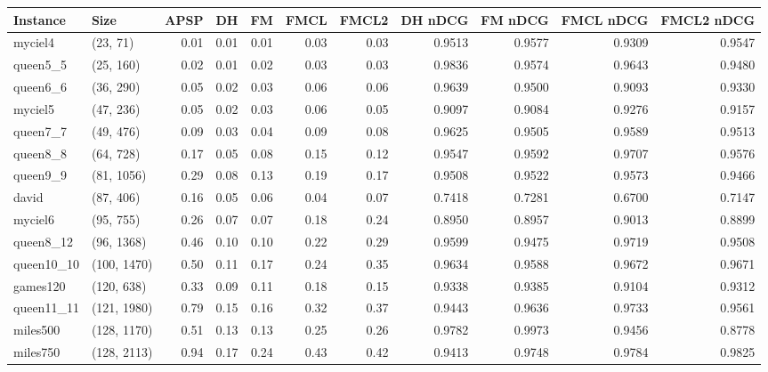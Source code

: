 \begin{tabular}{llrrrrrrrrr}
\toprule
  Instance &         Size &  APSP &   DH &   FM &  FMCL &  FMCL2 &  DH nDCG &  FM nDCG &  FMCL nDCG &  FMCL2 nDCG \\
\midrule
   myciel4 &     (23, 71) &  0.01 & 0.01 & 0.01 &  0.03 &   0.03 &   0.9513 &   0.9577 &     0.9309 &      0.9547 \\
  queen5\_5 &    (25, 160) &  0.02 & 0.01 & 0.02 &  0.03 &   0.03 &   0.9836 &   0.9574 &     0.9643 &      0.9480 \\
  queen6\_6 &    (36, 290) &  0.05 & 0.02 & 0.03 &  0.06 &   0.06 &   0.9639 &   0.9500 &     0.9093 &      0.9330 \\
   myciel5 &    (47, 236) &  0.05 & 0.02 & 0.03 &  0.06 &   0.05 &   0.9097 &   0.9084 &     0.9276 &      0.9157 \\
  queen7\_7 &    (49, 476) &  0.09 & 0.03 & 0.04 &  0.09 &   0.08 &   0.9625 &   0.9505 &     0.9589 &      0.9513 \\
  queen8\_8 &    (64, 728) &  0.17 & 0.05 & 0.08 &  0.15 &   0.12 &   0.9547 &   0.9592 &     0.9707 &      0.9576 \\
  queen9\_9 &   (81, 1056) &  0.29 & 0.08 & 0.13 &  0.19 &   0.17 &   0.9508 &   0.9522 &     0.9573 &      0.9466 \\
     david &    (87, 406) &  0.16 & 0.05 & 0.06 &  0.04 &   0.07 &   0.7418 &   0.7281 &     0.6700 &      0.7147 \\
   myciel6 &    (95, 755) &  0.26 & 0.07 & 0.07 &  0.18 &   0.24 &   0.8950 &   0.8957 &     0.9013 &      0.8899 \\
 queen8\_12 &   (96, 1368) &  0.46 & 0.10 & 0.10 &  0.22 &   0.29 &   0.9599 &   0.9475 &     0.9719 &      0.9508 \\
queen10\_10 &  (100, 1470) &  0.50 & 0.11 & 0.17 &  0.24 &   0.35 &   0.9634 &   0.9588 &     0.9672 &      0.9671 \\
  games120 &   (120, 638) &  0.33 & 0.09 & 0.11 &  0.18 &   0.15 &   0.9338 &   0.9385 &     0.9104 &      0.9312 \\
queen11\_11 &  (121, 1980) &  0.79 & 0.15 & 0.16 &  0.32 &   0.37 &   0.9443 &   0.9636 &     0.9733 &      0.9561 \\
  miles500 &  (128, 1170) &  0.51 & 0.13 & 0.13 &  0.25 &   0.26 &   0.9782 &   0.9973 &     0.9456 &      0.8778 \\
  miles750 &  (128, 2113) &  0.94 & 0.17 & 0.24 &  0.43 &   0.42 &   0.9413 &   0.9748 &     0.9784 &      0.9825 \\

\end{tabular}
